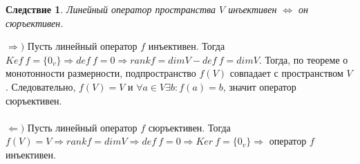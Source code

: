 \newtheorem*{cor11_4_1}{Следствие}\begin{cor11_4_1}Линейный оператор пространства $V$ инъективен $\Longleftrightarrow$ он сюръективен.
\end{cor11_4_1}\begin{Proof}
	$\Rightarrow)$ Пусть линейный оператор $f$ инъективен. Тогда $Kef\ f = \{0_v\}\Rightarrow def\ f = 0\Rightarrow rankf = dimV - def\ f = dim V$. Тогда, по теореме о монотонности размерности, подпространство $f(V)$ совпадает с пространством $V$. Следовательно, $f(V) = V$ и $\forall a \in V \exists b : f(a) = b$, значит оператор сюръективен.\\\\
	$\Leftarrow)$ Пусть линейный оператор $f$ сюръективен. Тогда $f(V) = V\Rightarrow rank f = dim V \Rightarrow def\ f = 0\Rightarrow Ker\ f =\{0_v\} \Rightarrow$ оператор $f$ инъективен.
\end{Proof}











